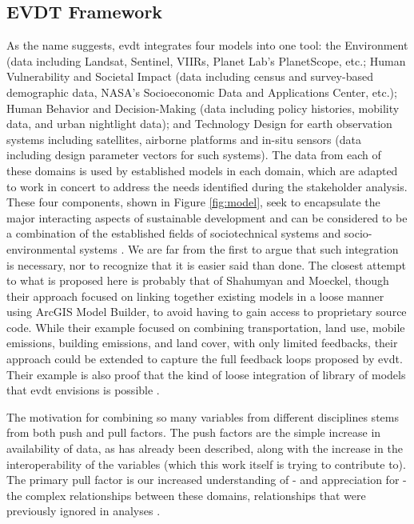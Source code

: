 \documentclass[notitlepage]{article}
\begin{document}
\subsection{EVDT Framework} \label{sec:evdt}

As the name suggests, \ac{evdt} integrates four models into one tool: the Environment (data including Landsat, Sentinel, VIIRs, Planet Lab’s PlanetScope, etc.; Human Vulnerability and Societal Impact (data including census and survey-based demographic data, NASA’s Socioeconomic Data and Applications Center, etc.); Human Behavior and Decision-Making (data including policy histories, mobility data, and urban nightlight data); and Technology Design for earth observation systems including satellites, airborne platforms and in-situ sensors (data including design parameter vectors for such systems). The data from each of these domains is used by established models in each domain, which are adapted to work in concert to address the needs identified during the stakeholder analysis. These four components, shown in Figure \ref{fig:model}, seek to encapsulate the major interacting aspects of sustainable development and can be considered to be a combination of the established fields of sociotechnical systems \cite{rouseUnderstandingChangeComplex2012,siddiqiSociotechnicalSystemsSustainability2017,sussmanTeachingComplexSociotechnical2010} and socio-environmental systems \cite{elsawahEightGrandChallenges2020}. We are far from the first to argue that such integration is necessary, nor to recognize that it is easier said than done. The closest attempt to what is proposed here is probably that of Shahumyan and Moeckel, though their approach focused on linking together existing models in a loose manner using ArcGIS Model Builder, to avoid having to gain access to proprietary source code. While their example focused on combining transportation, land use, mobile emissions, building emissions, and land cover, with only limited feedbacks, their approach could be extended to capture the full feedback loops proposed by \ac{evdt}. Their example is also proof that the kind of loose integration of library of models that \ac{evdt} envisions is possible \cite{shahumyanIntegrationLandUse2017}. 

The motivation for combining so many variables from different disciplines stems from both push and pull factors. The push factors are the simple increase in availability of data, as has already been described, along with the increase in the interoperability of the variables (which this work itself is trying to contribute to). The primary pull factor is our increased understanding of - and appreciation for - the complex relationships between these domains, relationships that were previously ignored in analyses \cite{gaheganMultivariateGeovisualization2007}. 
\end{document}
